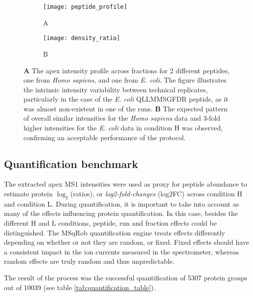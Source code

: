 \begin{figure}[H]
\begin{subfigure}{.9\textwidth}
  \centering
    \caption*{A}
\texttt{[image: peptide\_profile]}
\end{subfigure}
\bigskip

\begin{subfigure}{.9\textwidth}
  \centering
    \caption*{B}
\texttt{[image: density\_ratio]}
\end{subfigure}
\caption{\textbf{A} The apex intensity profile across fractions for 2 different peptides, one from \textit{Homo sapiens}, and one from \textit{E. coli}. The figure illustrates the intrinsic intensity variability between technical replicates, particularly in the case of the \textit{E. coli} QLLMMSGFDR peptide, as it was almost non-existent in one of the runs. \textbf{B} The expected pattern of overall similar intensities for the \textit{Homo sapiens} data and 3-fold higher intensities for the \textit{E. coli} data in condition H was observed, confirming an acceptable performance of the protocol.}
\label{fig:apex_intensity}
\end{figure}


\subsection{Quantification benchmark}
\label{subsec:quantification}

The extracted apex MS1 intensities were used as proxy for peptide abundance to estimate protein $\log_2$(ratios), or \textit{log2-fold-changes} (\ac{log2FC}) across condition H and condition L. During quantification, it is important to take into account as many of the effects influencing protein quantification. In this case, besides the different H and L conditions, peptide, run and fraction effects could be distinguished. The MSqRob quantification engine treats effects differently depending on whether or not they are random, or fixed. Fixed effects should have a consistent impact in the ion currents measured in the spectrometer, whereas random effects are truly random and thus unpredictable.

The result of the process was the successful quantification of 5307 protein groups out of 10039 (see table \ref{tab:quantification_table}).


